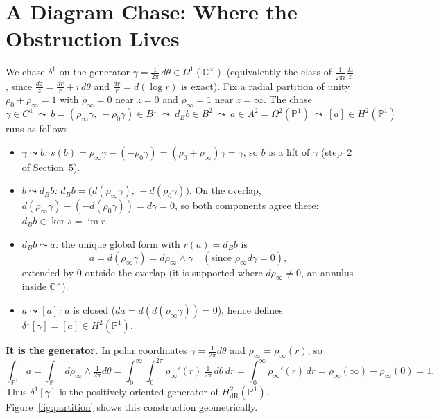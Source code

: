 \documentclass[11pt]{article}
\newcommand{\CC}{\mathbb C}
\newcommand{\PP}{\mathbb P}
\newcommand{\dR}{\mathrm{dR}}
\newcommand{\im}{\operatorname{im}}
\newcommand{\kerop}{\operatorname{ker}}
\theoremstyle{plain}
\theoremstyle{definition}
\begin{document}
\section{A Diagram Chase: Where the Obstruction Lives}
We chase $\delta^1$ on the generator $\gamma=\tfrac{1}{2\pi}\,d\theta\in
\Omega^1(\CC^\times)$ (equivalently the class of $\tfrac{1}{2\pi i}\tfrac{dz}{z}$,
since $\tfrac{dz}{z}=\tfrac{dr}{r}+i\,d\theta$ and $\tfrac{dr}{r}=d(\log r)$ is
exact). Fix a radial partition of unity $\rho_0+\rho_\infty=1$ with $\rho_\infty=0$
near $z=0$ and $\rho_\infty=1$ near $z=\infty$. The chase
\[
  \gamma\in C^1
  \ \leadsto\ b=(\rho_\infty\gamma,\,-\rho_0\gamma)\in B^1
  \ \leadsto\ d_Bb\in B^2
  \ \leadsto\ a\in A^2=\Omega^2(\PP^1)
  \ \leadsto\ [a]\in H^2(\PP^1)
\]
runs as follows.
\begin{itemize}
  \item \emph{$\gamma\leadsto b$:} $s(b)=\rho_\infty\gamma-(-\rho_0\gamma)
        =(\rho_0+\rho_\infty)\gamma=\gamma$, so $b$ is a lift of $\gamma$ (step~2 of
        Section~5).
  \item \emph{$b\leadsto d_Bb$:} $d_Bb=\bigl(d(\rho_\infty\gamma),\,-d(\rho_0\gamma)\bigr)$.
        On the overlap, $d(\rho_\infty\gamma)-(-d(\rho_0\gamma))=d\gamma=0$, so both
        components agree there: $d_Bb\in\kerop s=\im r$.
  \item \emph{$d_Bb\leadsto a$:} the unique global form with $r(a)=d_Bb$ is
        \[
          a=d(\rho_\infty\gamma)=d\rho_\infty\wedge\gamma
          \quad(\text{since } \rho_\infty d\gamma=0),
        \]
        extended by $0$ outside the overlap (it is supported where $d\rho_\infty\neq0$,
        an annulus inside $\CC^\times$).
  \item \emph{$a\leadsto[a]$:} $a$ is closed ($da=d(d(\rho_\infty\gamma))=0$), hence
        defines $\delta^1[\gamma]=[a]\in H^2(\PP^1)$.
\end{itemize}
\textbf{It is the generator.} In polar coordinates $\gamma=\tfrac{1}{2\pi}d\theta$
and $\rho_\infty=\rho_\infty(r)$, so
\[
  \int_{\PP^1}a=\int_{\PP^1}d\rho_\infty\wedge\tfrac{1}{2\pi}d\theta
  =\int_0^\infty\!\!\int_0^{2\pi}\rho_\infty'(r)\,\tfrac{1}{2\pi}\,d\theta\,dr
  =\int_0^\infty\rho_\infty'(r)\,dr=\rho_\infty(\infty)-\rho_\infty(0)=1 .
\]
Thus $\delta^1[\gamma]$ is the positively oriented generator of $H^2_\dR(\PP^1)$.
Figure~\ref{fig:partition} shows this construction geometrically.
\end{document}
